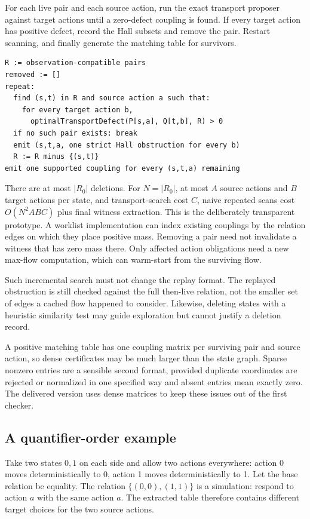 For each live pair and each source action, run the exact transport proposer
against target actions until a zero-defect coupling is found. If every target
action has positive defect, record the Hall subsets and remove the pair.
Restart scanning, and finally generate the matching table for survivors.

\begin{lstlisting}
R := observation-compatible pairs
removed := []
repeat:
  find (s,t) in R and source action a such that:
    for every target action b,
      optimalTransportDefect(P[s,a], Q[t,b], R) > 0
  if no such pair exists: break
  emit (s,t,a, one strict Hall obstruction for every b)
  R := R minus {(s,t)}
emit one supported coupling for every (s,t,a) remaining
\end{lstlisting}

There are at most $|R_0|$ deletions. For $N=|R_0|$, at most $A$ source actions
and $B$ target actions per state, and transport-search cost $C$, naive repeated
scans cost $O(N^2ABC)$ plus final witness extraction. This is the deliberately
transparent prototype. A worklist implementation can index existing couplings
by the relation edges on which they place positive mass. Removing a pair need
not invalidate a witness that has zero mass there. Only affected action
obligations need a new max-flow computation, which can warm-start from the
surviving flow.

Such incremental search must not change the replay format. The replayed
obstruction is still checked against the full then-live relation, not the
smaller set of edges a cached flow happened to consider. Likewise, deleting
states with a heuristic similarity test may guide exploration but cannot
justify a deletion record.

A positive matching table has one coupling matrix per surviving pair and source
action, so dense certificates may be much larger than the state graph.
Sparse nonzero entries are a sensible second format, provided duplicate
coordinates are rejected or normalized in one specified way and absent entries
mean exactly zero. The delivered version uses dense matrices to keep these
issues out of the first checker.

\subsection{A quantifier-order example}

Take two states $0,1$ on each side and allow two actions everywhere: action 0
moves deterministically to 0, action 1 moves deterministically to 1. Let the
base relation be equality. The relation $\{(0,0),(1,1)\}$ is a simulation:
respond to action $a$ with the same action $a$. The extracted table therefore
contains different target choices for the two source actions.

